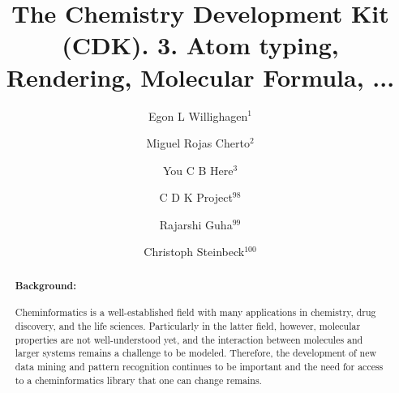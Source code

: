 \documentclass[10pt]{bmc_article}
\newenvironment{bmcformat}{\begin{raggedright}\baselineskip20pt\sloppy\setboolean{publ}{false}}{\end{raggedright}\baselineskip20pt\sloppy}
\begin{document}
\begin{bmcformat}

\title{The Chemistry Development Kit (CDK). 3. Atom typing, Rendering, Molecular Formula, ...}
 
\author{
  Egon L Willighagen$^{1}$%
\and
  Miguel Rojas Cherto$^2$%
\and
  You C B Here$^3$%
\and
  C D K Project\correspondingauthor$^98$%
\and
  Rajarshi Guha$^99$%
\and
  Christoph Steinbeck$^100$%
}
      
\address{
    \iid(1)Division of Molecular Toxicology, Institute of Environmental Medicine, Karolinska Institutet, SE-17177 Stockholm, Sweden\\
    \iid(2)Division of Analytical Biosciences, Leiden/Amsterdam Center for Drug Research, Leiden, The Netherlands \\
    \iid(3)Example Ltd., Glasgow, UK \\
    \iid(98)\url{http://cdk.sourceforge.net/} \\
    \iid(99)NIH Center for Translational Therapeutics, 9800 Medical Center Drive, Rockville, MD 20878, USA \\
    \iid(100)Chemoinformatics and Metabolism team, European Bioinformatics Institute, Hinxton, UK 
}

\maketitle


\begin{abstract}
\paragraph*{Background:}
Cheminformatics is a well-established field with many applications in chemistry,
drug discovery, and the life sciences. Particularly in the latter field, however,
molecular properties are not well-understood yet, and the interaction between
molecules and larger systems remains a challenge to be modeled. Therefore, the
development of new data mining and pattern recognition continues to be important
and the need for access to a cheminformatics library that one can change remains.

\end{abstract}
\end{bmcformat}
\end{document}
